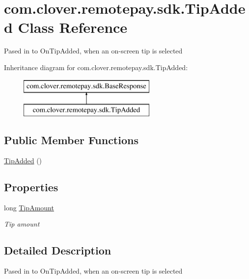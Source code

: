\hypertarget{classcom_1_1clover_1_1remotepay_1_1sdk_1_1_tip_added}{}\section{com.\+clover.\+remotepay.\+sdk.\+Tip\+Added Class Reference}
\label{classcom_1_1clover_1_1remotepay_1_1sdk_1_1_tip_added}


Pased in to On\+Tip\+Added, when an on-\/screen tip is selected  


Inheritance diagram for com.\+clover.\+remotepay.\+sdk.\+Tip\+Added\+:\begin{figure}[H]
\begin{center}
\leavevmode
\includegraphics[height=2.000000cm]{classcom_1_1clover_1_1remotepay_1_1sdk_1_1_tip_added}
\end{center}
\end{figure}
\subsection*{Public Member Functions}
\begin{DoxyCompactItemize}
\item 
\hyperlink{classcom_1_1clover_1_1remotepay_1_1sdk_1_1_tip_added_a1fcf7127a24af8673bfd311ddc81f425}{Tip\+Added} ()
\end{DoxyCompactItemize}
\subsection*{Properties}
\begin{DoxyCompactItemize}
\item 
long \hyperlink{classcom_1_1clover_1_1remotepay_1_1sdk_1_1_tip_added_a837fb32742e50ee6b7690da34cbb6c33}{Tip\+Amount}
\begin{DoxyCompactList}\small\item\em Tip amount \end{DoxyCompactList}\end{DoxyCompactItemize}


\subsection{Detailed Description}
Pased in to On\+Tip\+Added, when an on-\/screen tip is selected 



